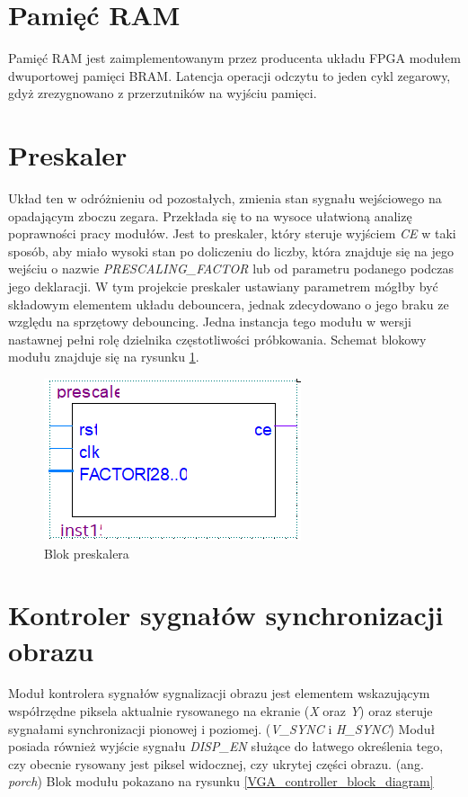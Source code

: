 	
\section{Pamięć RAM}
	Pamięć RAM jest zaimplementowanym przez producenta układu FPGA modułem dwuportowej pamięci BRAM. Latencja operacji odczytu to jeden cykl zegarowy, gdyż zrezygnowano z przerzutników na wyjściu pamięci.
\section{Preskaler}
	Układ ten w odróżnieniu od pozostałych, zmienia stan sygnału wejściowego na opadającym zboczu zegara. Przekłada się to na wysoce ułatwioną analizę poprawności pracy modułów.
	Jest to preskaler, który steruje wyjściem \emph{CE} w taki sposób, aby miało wysoki stan po doliczeniu do liczby, która znajduje się na jego wejściu o nazwie \emph{PRESCALING\_FACTOR} lub od parametru podanego podczas jego deklaracji. W tym projekcie preskaler ustawiany parametrem mógłby być składowym elementem układu debouncera, jednak zdecydowano o jego braku ze względu na sprzętowy debouncing.
	Jedna instancja tego modułu w wersji nastawnej pełni rolę dzielnika częstotliwości próbkowania.
	Schemat blokowy modułu znajduje się na rysunku \ref{prescaler_block_diagram}.
	
	\begin{figure}[H]
	\centering
	\includegraphics[width = 0.3 \paperwidth]{images/prescaler_block_diagram.png}
	\caption{Blok preskalera}
	\label{prescaler_block_diagram}
	\end{figure}
\section{Kontroler sygnałów synchronizacji obrazu} 
Moduł kontrolera sygnałów sygnalizacji obrazu jest elementem wskazującym współrzędne piksela aktualnie rysowanego na ekranie (\emph{X} oraz \emph{Y}) oraz steruje sygnałami synchronizacji pionowej i poziomej. (\emph{V\_SYNC} i \emph{H\_SYNC})
Moduł posiada również wyjście sygnału \emph{DISP\_EN} służące do łatwego określenia tego, czy obecnie rysowany jest piksel widocznej, czy ukrytej części obrazu. (ang. \emph{porch})
Blok modułu pokazano na rysunku \ref{VGA_controller_block_diagram}

